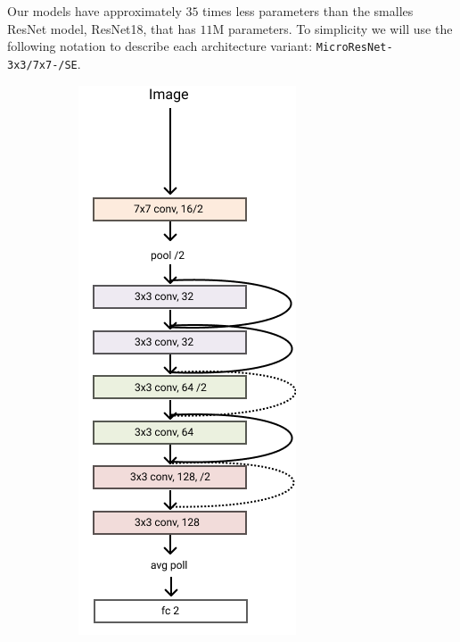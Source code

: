 \documentclass[../document.tex]{subfiles}
\begin{document}
Our models have approximately $35$ times less parameters than the smalles ResNet model, ResNet18, that has $11$M parameters. To simplicity we will use the following notation to describe each architecture variant: \texttt{MicroResNet-{3x3/7x7}-{/SE}}.
\begin{figure}[htbp]
    \centering
    \begin{subfigure}[b]{0.25\textwidth}
        \includegraphics[width=\textwidth]{../img/3/models/transparent-microresnet.png}

\end{subfigure}
\end{figure}
\end{document}
